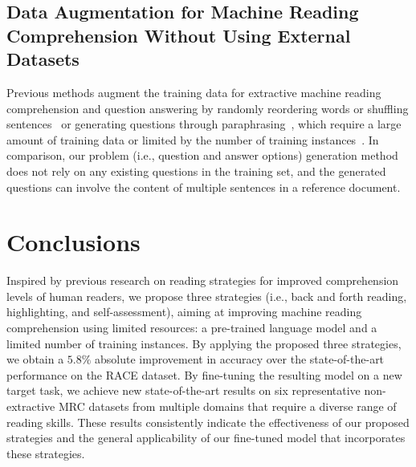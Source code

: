 \documentclass[11pt,a4paper]{article}
\newcommand{\ie}{{i.e.}}
\begin{document}
\subsection{Data Augmentation for Machine Reading Comprehension Without Using External Datasets}
Previous methods augment the training data for extractive machine reading comprehension and question answering by randomly reordering words or shuffling sentences~\cite{ding2018ynu,li2018lyb3b} or generating questions through paraphrasing~\cite{yang2017semi,yuan2017machine}, which require a large amount of training data or limited by the number of training instances~\cite{yu2018qanet}. In comparison, our problem (\ie, question and answer options) generation method does not rely on any existing questions in the training set, and the generated questions can involve the content of multiple sentences in a reference document.
























 \section{Conclusions}

Inspired by previous research on reading strategies for improved comprehension levels of human readers, we propose three strategies (\ie, back and forth reading, highlighting, and self-assessment), aiming at improving machine reading comprehension using limited resources: a pre-trained language model and a limited number of training instances. By applying the proposed three strategies, we obtain a $5.8\%$ absolute improvement in accuracy over the state-of-the-art performance on the RACE dataset. By fine-tuning the resulting model on a new target task, we achieve new state-of-the-art results on six representative non-extractive MRC datasets from multiple domains that require a diverse range of reading skills. These results consistently indicate the effectiveness of our proposed strategies and the general applicability of our fine-tuned model that incorporates these strategies. 
\end{document}
